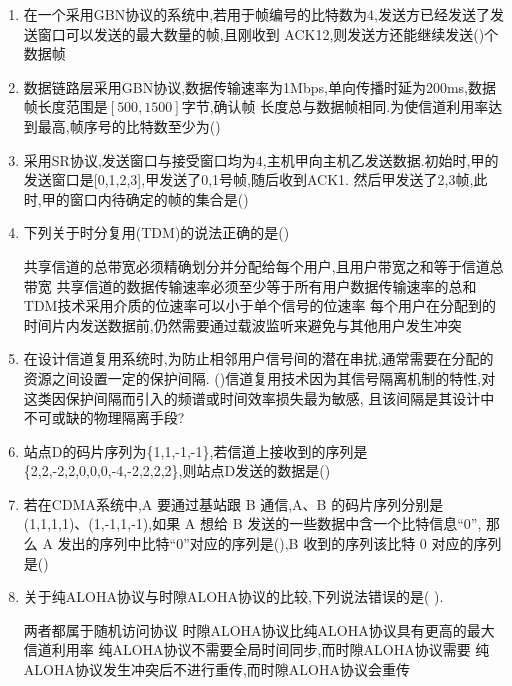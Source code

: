 \documentclass[12pt, a4paper, oneside, UTF8]{ctexbook}
\begin{document}
\begin{enumerate}
    \item 在一个采用GBN协议的系统中,若用于帧编号的比特数为4,发送方已经发送了发送窗口可以发送的最大数量的帧,且刚收到
    ACK12,则发送方还能继续发送(\qquad)个数据帧

    \item 数据链路层采用GBN协议,数据传输速率为1Mbps,单向传播时延为200ms,数据帧长度范围是$\left[500,1500\right]$字节,确认帧
    长度总与数据帧相同.为使信道利用率达到最高,帧序号的比特数至少为(\qquad)

    \item 采用SR协议,发送窗口与接受窗口均为4,主机甲向主机乙发送数据.初始时,甲的发送窗口是[0,1,2,3],甲发送了0,1号帧,随后收到ACK1.
    然后甲发送了2,3帧,此时,甲的窗口内待确定的帧的集合是(\qquad)

    \item 下列关于时分复用(TDM)的说法正确的是(\qquad)
    \begin{choices}[1]
        \task 共享信道的总带宽必须精确划分并分配给每个用户,且用户带宽之和等于信道总带宽
        \task 共享信道的数据传输速率必须至少等于所有用户数据传输速率的总和
        \task TDM技术采用介质的位速率可以小于单个信号的位速率
        \task 每个用户在分配到的时间片内发送数据前,仍然需要通过载波监听来避免与其他用户发生冲突
    \end{choices}

    \item 在设计信道复用系统时,为防止相邻用户信号间的潜在串扰,通常需要在分配的资源之间设置一定的保护间隔.
    (\qquad)信道复用技术因为其信号隔离机制的特性,对这类因保护间隔而引入的频谱或时间效率损失最为敏感,
    且该间隔是其设计中不可或缺的物理隔离手段?

    \item 站点D的码片序列为\{1,1,-1,-1\},若信道上接收到的序列是\{2,2,-2,2,0,0,0,-4,-2,2,2,2\},则站点D发送的数据是(\qquad)

    \item 若在CDMA系统中,A 要通过基站跟 B 通信,A、B 的码片序列分别是 
    (1,1,1,1)、(1,-1,1,-1),如果 A 想给 B 发送的一些数据中含一个比特信息“0”,
    那么 A 发出的序列中比特“0”对应的序列是(\qquad),B 收到的序列该比特 0 对应的序列是(\qquad)

    \item 关于纯ALOHA协议与时隙ALOHA协议的比较,下列说法错误的是( ).
    \begin{choices}[1]
    \task 两者都属于随机访问协议
    \task 时隙ALOHA协议比纯ALOHA协议具有更高的最大信道利用率
    \task 纯ALOHA协议不需要全局时间同步,而时隙ALOHA协议需要
    \task 纯ALOHA协议发生冲突后不进行重传,而时隙ALOHA协议会重传
    \end{choices}


\end{enumerate}
\end{document}

